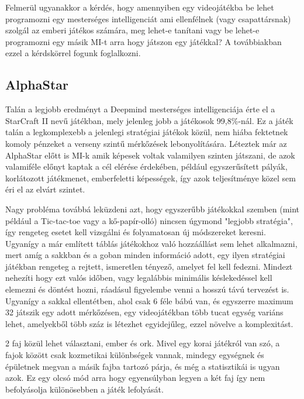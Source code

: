 Felmerül ugyanakkor a kérdés, hogy amennyiben egy videojátékba be lehet programozni egy mesterséges intelligenciát ami ellenfélnek (vagy csapattársnak) szolgál az emberi játékos számára, meg lehet-e tanítani vagy be lehet-e programozni egy másik MI-t arra hogy játszon egy játékkal? A továbbiakban ezzel a kérdskörrel fogunk foglalkozni.


\subsection{AlphaStar}
Talán a legjobb eredményt a Deepmind mesterséges intelligenciája érte el a StarCraft II nevű játékban, mely jelenleg jobb a játékosok 99,8\%-nál. 
Ez a játék talán a legkomplexebb a jelenlegi stratégiai játékok közül, nem hiába fektetnek komoly pénzeket a verseny szintű mérkőzések lebonyolítására.
Léteztek már az AlphaStar előtt is MI-k amik képesek voltak valamilyen szinten játszani, de azok valamiféle előnyt kaptak a cél elérése érdekében, például egyszerűsített pályák, korlátozott játékmenet, emberfeletti képességek, így azok teljesítménye közel sem éri el az elvárt szintet.

Nagy probléma továbbá leküzdeni azt, hogy egyszerűbb játékokkal szemben (mint például a Tic-tac-toe vagy a kő-papír-olló) nincsen úgymond "legjobb stratégia", így rengeteg esetet kell vizsgálni és folyamatosan új módszereket keresni. Ugyanígy a már említett táblás játékokhoz való hozzáállást sem lehet alkalmazni, mert amíg a sakkban és a goban minden információ adott, egy ilyen stratégiai játékban rengeteg a rejtett, ismeretlen tényező, amelyet fel kell fedezni. Mindezt nehezíti hogy ezt valós időben, vagy legalábbis minimális késlekedéssel kell elemezni és döntést hozni, ráadásul figyelembe venni a hosszú távú tervezést is. Ugyanígy a sakkal ellentétben, ahol csak 6 féle bábú van, és egyszerre maximum 32 játszik egy adott mérkőzésen, egy videojátékban több tucat egység variáns lehet, amelyekből több száz is létezhet egyidejűleg, ezzel növelve a komplexitást.


2 faj közül lehet választani, ember és ork. Mivel egy korai játékról van szó, a fajok között csak kozmetikai különbségek vannak, mindegy egységnek és épületnek megvan a másik fajba tartozó párja, és még a statisztikái is ugyan azok. Ez egy olcsó mód arra hogy egyensúlyban legyen a két faj így nem befolyásolja különösebben a játék lefolyását.

